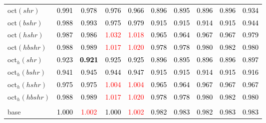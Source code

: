 \begin{tabular}[t]{>{\centering\arraybackslash}m{2.5cm}ccccccccc}
oct$(shr)$ & \textcolor{black}{0.991} & \textcolor{black}{0.978} & \textcolor{black}{0.976} & \textcolor{black}{0.966} & \textcolor{black}{0.896} & \textcolor{black}{0.895} & \textcolor{black}{0.896} & \textcolor{black}{0.896} & \textcolor{black}{0.934}\\
oct$(bshr)$ & \textcolor{black}{0.988} & \textcolor{black}{0.993} & \textcolor{black}{0.975} & \textcolor{black}{0.979} & \textcolor{black}{0.915} & \textcolor{black}{0.915} & \textcolor{black}{0.914} & \textcolor{black}{0.915} & \textcolor{black}{0.944}\\
oct$(hshr)$ & \textcolor{black}{0.987} & \textcolor{black}{0.986} & \textcolor{red}{1.032} & \textcolor{red}{1.018} & \textcolor{black}{0.965} & \textcolor{black}{0.964} & \textcolor{black}{0.967} & \textcolor{black}{0.967} & \textcolor{black}{0.979}\\
oct$(hbshr)$ & \textcolor{black}{0.988} & \textcolor{black}{0.989} & \textcolor{red}{1.017} & \textcolor{red}{1.020} & \textcolor{black}{0.978} & \textcolor{black}{0.978} & \textcolor{black}{0.980} & \textcolor{black}{0.982} & \textcolor{black}{0.980}\\
oct$_h(shr)$ & \textcolor{black}{0.923} & \textcolor{black}{\textbf{0.921}} & \textcolor{black}{0.925} & \textcolor{black}{0.925} & \textcolor{black}{0.896} & \textcolor{black}{0.895} & \textcolor{black}{0.896} & \textcolor{black}{0.896} & \textcolor{black}{0.897}\\
oct$_h(bshr)$ & \textcolor{black}{0.941} & \textcolor{black}{0.945} & \textcolor{black}{0.944} & \textcolor{black}{0.947} & \textcolor{black}{0.915} & \textcolor{black}{0.915} & \textcolor{black}{0.914} & \textcolor{black}{0.915} & \textcolor{black}{0.916}\\
oct$_h(hshr)$ & \textcolor{black}{0.975} & \textcolor{black}{0.975} & \textcolor{red}{1.004} & \textcolor{red}{1.004} & \textcolor{black}{0.965} & \textcolor{black}{0.964} & \textcolor{black}{0.967} & \textcolor{black}{0.967} & \textcolor{black}{0.967}\\
oct$_h(hbshr)$ & \textcolor{black}{0.988} & \textcolor{black}{0.989} & \textcolor{red}{1.017} & \textcolor{red}{1.020} & \textcolor{black}{0.978} & \textcolor{black}{0.978} & \textcolor{black}{0.980} & \textcolor{black}{0.982} & \textcolor{black}{0.980}\\
\addlinespace[0.3em]
\multicolumn{10}{c}{\textbf{$k = 1$}}\\
base & \textcolor{black}{1.000} & \textcolor{red}{1.002} & \textcolor{black}{1.000} & \textcolor{red}{1.002} & \textcolor{black}{0.982} & \textcolor{black}{0.983} & \textcolor{black}{0.982} & \textcolor{black}{0.983} & \textcolor{black}{0.983}\\

\end{tabular}
